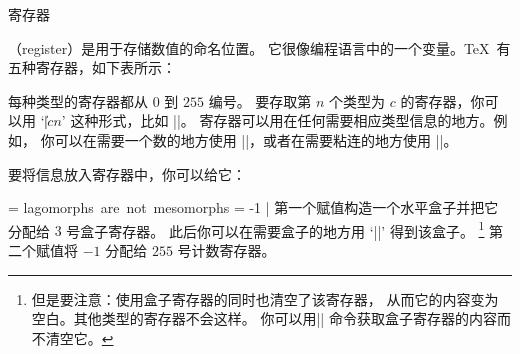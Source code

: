 {{{{{%
\concept 寄存器

（register）是用于存储数值的命名位置。
它很像编程语言中的一个变量。\TeX\ 有五种寄存器，如下表所示：


每种类型的寄存器都从 $0$ 到 $255$ 编号。
要存取第 $n$ 个类型为 $c$ 的寄存器，你可以用 `|\|$cn$' 这种形式，比如 ||。
寄存器可以用在任何需要相应类型信息的地方。例如，
你可以在需要一个数的地方使用 ||，或者在需要粘连的地方使用 ||。

要将信息放入寄存器中，你可以给它：

\csdisplay
{} = \hbox{lagomorphs are not mesomorphs}
 = -1
|
第一个赋值构造一个水平盒子并把它分配给 $3$ 号盒子寄存器。
此后你可以在需要盒子的地方用 `||' 得到该盒子。
\footnote{但是要注意：使用盒子寄存器的同时也清空了该寄存器，
从而它的内容变为空白。其他类型的寄存器不会这样。
你可以用|\copy| 命令\ctsref{\copy}获取盒子寄存器的内容而不清空它。}
第二个赋值将 $-1$ 分配给 $255$ 号计数寄存器。

}}}}}
